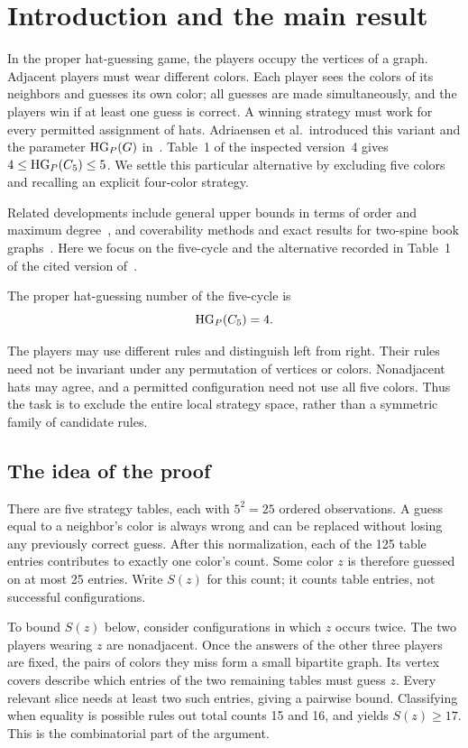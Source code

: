 \section{Introduction and the main result}\label{sec:introduction}
In the proper hat-guessing game, the players occupy the vertices of a graph.
Adjacent players must wear different colors. Each player sees the colors
of its neighbors and guesses its own color; all guesses are made
simultaneously, and the players win if at least one guess is correct.
A winning strategy must work for every permitted assignment of hats.
Adriaensen et al.\ introduced this variant and the parameter $\operatorname{HG}_{P}(G)$
in~\cite{proper}. Table~1 of the inspected version~4 gives
$4\leq\operatorname{HG}_{P}(C_5)\leq5$. We settle this particular alternative by excluding
five colors and recalling an explicit four-color strategy.

Related developments include general upper bounds in terms of order and
maximum degree~\cite{kakatelis}, and coverability methods and exact results
for two-spine book graphs~\cite{zhai}. Here we focus on the five-cycle
and the alternative recorded in Table~1 of the cited version of~\cite{proper}.

\begin{theorem}\label{thm:main}
The proper hat-guessing number of the five-cycle is
\[
\operatorname{HG}_{P}(C_5)=4.
\]
\end{theorem}

The players may use different rules and distinguish left from right.
Their rules need not be invariant under any permutation of vertices or
colors. Nonadjacent hats may agree, and a permitted configuration need
not use all five colors. Thus the task is to exclude the entire local
strategy space, rather than a symmetric family of candidate rules.

\subsection{The idea of the proof}
There are five strategy tables, each with $5^2=25$ ordered observations.
A guess equal to a neighbor's color is always wrong and can be replaced
without losing any previously correct guess. After this normalization,
each of the 125 table entries contributes to exactly one color's count.
Some color $z$ is therefore guessed on at most 25 entries. Write $S(z)$
for this count; it counts table entries, not successful configurations.

To bound $S(z)$ below, consider configurations in which $z$ occurs twice.
The two players wearing $z$ are nonadjacent. Once the answers of the other
three players are fixed, the pairs of colors they miss form a small
bipartite graph. Its vertex covers describe which entries of the two
remaining tables must guess $z$. Every relevant slice needs at least two
such entries, giving a pairwise bound. Classifying when equality is
possible rules out total counts 15 and 16, and yields $S(z)\geq17$.
This is the combinatorial part of the argument.

